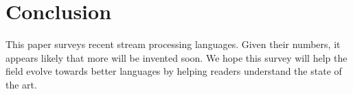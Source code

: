 \section{Conclusion}\label{sec:conclusion}

This paper surveys recent stream processing languages. Given their
numbers, it appears likely that more will be invented soon. We hope
this survey will help the field evolve towards better languages by
helping readers understand the state of the art.


